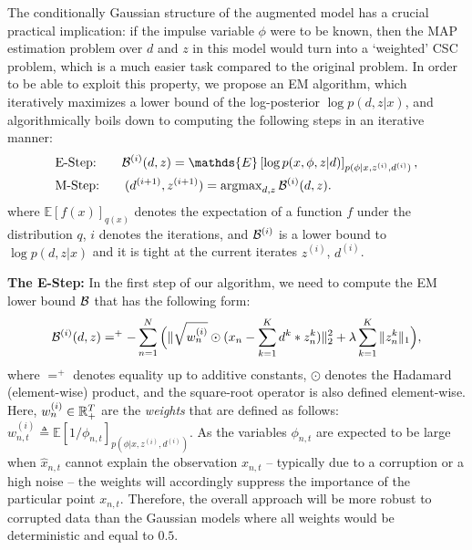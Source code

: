 The conditionally Gaussian structure of the augmented model has a crucial practical implication: if the impulse variable $\phi$ were to be known, then the \ac{MAP} estimation problem over $d$ and $z$ in this model would turn into a `weighted' \ac{CSC} problem, which is a much easier task compared to the original problem. In order to be able to exploit this property, we propose an \ac{EM} algorithm, which iteratively maximizes a lower bound of the log-posterior $\log p(d,z|x)$, and algorithmically boils down to computing the following steps in an iterative manner:
\begin{align}
&\text{E-Step:} \hspace{20pt} {\cal B}^{(i)}(d,z) = \mathds{E}\left[\log p(x,\phi,z|d)\right]_{p(\phi|x,z^{(i)},d^{(i)})}, \\
&\text{M-Step:} \hspace{20pt} (d^{(i+1)}, z^{(i+1)}) = \argmax\nolimits_{d,z} {\cal B}^{(i)}(d,z). \label{eq:mstep}
\end{align}
where $\mathds{E}[f(x)]_{q(x)}$ denotes the expectation of a function $f$ under the distribution $q$, $i$ denotes the iterations, and ${\cal B}^{(i)}$ is a lower bound to $\log p(d,z|x)$ and it is tight at the current iterates $z^{(i)}$, $d^{(i)}$.



%

%

\textbf{The E-Step:} 
In the first step of our algorithm, we need to compute the \ac{EM} lower bound ${\cal B}$ that has the following form:
\begin{align}
{\cal B}^{(i)}(d,z) =^+ - \sum_{n=1}^N \Big( \|\sqrt{w_{n}^{(i)}} \odot (x_{n} - \sum_{k=1}^{K}d^{k} * z_{n}^{k})\|_{2}^{2} + \lambda \sum_{k=1}^K{\|z_{n}^{k}\|_1}\Big),
\end{align}
where $=^+$ denotes equality up to additive constants, $\odot$ denotes the Hadamard (element-wise) product, and the square-root operator is also defined element-wise. Here, $w_{n}^{(i)} \in \mathbb{R}^T_+$ are the \emph{weights} that are defined as follows: $w_{n,t}^{(i)} \triangleq \mathds{E}\left[1/{\phi_{n,t}}\right]_{p(\phi|x,z^{(i)},d^{(i)})}$. As the variables $\phi_{n,t}$ are expected to be large when $\hat{x}_{n,t}$ cannot explain the observation $x_{n,t}$ -- typically due to a corruption or a high noise -- the weights will accordingly suppress the importance of the particular point $x_{n,t}$. Therefore, the overall approach will be more robust to corrupted data than the Gaussian models where all weights would be deterministic and equal to $0.5$. 

